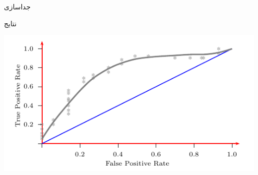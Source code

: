 \documentclass[debug,a0paper,portrait]{xebaposter}
\begin{document}
\begin{poster}
\begin{posterbox}[name=phase4,column=2,span=1,below=phase3]{جداسازی}
\ptext[6]
\end{posterbox}
\begin{posterbox}[name=results,column=1,span=2,below=phase2]{نتایج}
\begin{multicols}{2}
    \centerline{\includegraphics[scale=.7]{fig6}}
    \ptext[2-3]
    

\end{multicols}
\end{posterbox}
\end{poster}
\end{document}
